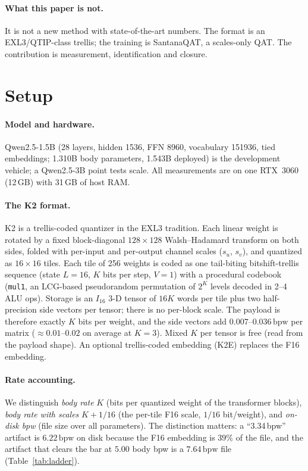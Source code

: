 \documentclass[11pt,a4paper]{article}
\newcommand{\bpw}{\,\mathrm{bpw}}
\begin{document}
\paragraph{What this paper is not.} It is not a new method with state-of-the-art numbers. The
format is an EXL3/QTIP-class trellis; the training is SantanaQAT, a scales-only QAT. The contribution is
measurement, identification and closure.

\section{Setup}
\label{sec:setup}

\paragraph{Model and hardware.} Qwen2.5-1.5B (28 layers, hidden 1536, FFN 8960, vocabulary
151936, tied embeddings; 1.310B body parameters, 1.543B deployed) is the development vehicle; a
Qwen2.5-3B point tests scale. All measurements are on one RTX~3060 (12\,GB) with 31\,GB of host
RAM.

\paragraph{The K2 format.} K2 is a trellis-coded quantizer in the EXL3 tradition. Each linear
weight is rotated by a fixed block-diagonal $128\times128$ Walsh--Hadamard transform on both
sides, folded with per-input and per-output channel scales ($s_u$, $s_v$), and quantized as
$16\times16$ tiles. Each tile of 256 weights is coded as one tail-biting bitshift-trellis sequence
(state $L=16$, $K$ bits per step, $V=1$) with a procedural codebook (\texttt{mul1}, an LCG-based
pseudorandom permutation of $2^K$ levels decoded in 2--4 ALU ops). Storage is an $I_{16}$ 3-D
tensor of $16K$ words per tile plus two half-precision side vectors per tensor; there is no
per-block scale. The payload is therefore exactly $K$ bits per weight, and the side vectors add
$0.007$--$0.036\bpw$ per matrix ($\approx0.01$--$0.02$ on average at $K=3$). Mixed $K$ per tensor
is free (read from the payload shape). An optional trellis-coded embedding (K2E) replaces the F16
embedding.

\paragraph{Rate accounting.} We distinguish \emph{body rate} $K$ (bits per quantized weight of
the transformer blocks), \emph{body rate with scales} $K+1/16$ (the per-tile F16 scale, $1/16$
bit/weight), and \emph{on-disk bpw} (file size over all parameters). The distinction matters:
a ``3.34\,bpw'' artifact is $6.22\bpw$ on disk because the F16 embedding is $39\%$ of the file,
and the artifact that clears the bar at $5.00$ body bpw is a $7.64\bpw$ file (Table~\ref{tab:ladder}).
\end{document}
